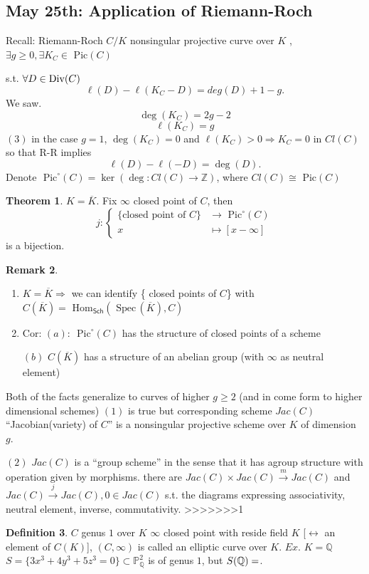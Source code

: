 \documentclass[11pt]{article}
\theoremstyle{definition}
\newtheorem{thm}{Theorem}[section]
\newtheorem{dfn}[thm]{Definition}
\newtheorem{rmk}[thm]{Remark}
\renewcommand{\hom}{\text{ Hom}}
\newcommand{\pic}{\text{ Pic}}
\newcommand{\spec}{\text{ Spec}\,}
\newcommand{\proj}{\mathbb P}
\newcommand{\intg}{\mathbb Z}
\newcommand{\ratl}{\mathbb Q}
\newcommand{\Div}{\textnormal{Div}}
\newcommand{\Lrta}{\Longrightarrow}
\newcommand{\lrta}{\longrightarrow}
\newcommand{\llrta}{\longleftrightarrow}
\begin{document}
\subsection{May 25th: Application of Riemann-Roch}

Recall:
Riemann-Roch $C/K$ nonsingular projective curve over $K$ , $\exists g\geq 0,\exists K_C\in  \pic(C)$

s.t. $\forall D\in \Div(C)$
$$
\ell(D)-\ell (K_C-D)=deg(D)+1-g.
$$
We saw. 
$$
\deg(K_C)=2g-2
$$
$$
\ell(K_C)=g
$$
$(3)$ in the case  $g=1$, $\deg(K_C)=0$ and $\ell(K_C)>0\Lrta K_C=0$ in $Cl(C)$ so that R-R
implies
$$
\ell(D)-\ell(-D)=\deg(D).
$$
Denote $\pic^\circ(C)=\ker(\deg:Cl(C)\lrta\intg)$, where $Cl(C)\cong \pic (C)$
\begin{thm}
$K=\overline{K}$. Fix $\infty$ closed point of $C$, then 
$$
j:\left\{\begin{aligned}
\{\text{closed point of $C$}\}&\lrta\pic^\circ(C)\\
x & \longmapsto [x-\infty]
\end{aligned}\right.
$$
is a bijection.

\end{thm}
\begin{rmk}
\begin{enumerate}[label=(\arabic*)]
\item $K=\overline{K}\Lrta $ we can identify \{ closed points of $C$\} with 
$C(\overline{K})=\hom_{\mathsf{Sch}}(\spec(\overline{K}),C)$
\item Cor: $(a)$: $\pic^\circ(C)$ has the structure of closed points of a scheme

$(b)$ $C(\overline{K})$ has  a structure of an abelian group (with $\infty$ as neutral element)
\end{enumerate}
\end{rmk}
Both of the facts generalize to curves of higher $g\geq 2$ (and in come form to higher dimensional schemes) $(1)$ is true but corresponding scheme $Jac(C)$ ``Jacobian(variety) of  $C$'' is a nonsingular projective scheme over $K$ of dimension $g$.

$(2)$ $Jac(C)$ is a ``group scheme'' in the sense that it has agroup structure with operation given by morphisms. there are $Jac(C)\times Jac(C)\overset{m}{\lrta} Jac(C)$ and $Jac(C)\overset{j}{\lrta}Jac(C), 0\in Jac(C)$ s.t. the diagrams expressing associativity, neutral element, inverse, commutativity.
>>>>>>>1

\begin{dfn}
 $C$ genus $1$ over $K$ $\infty$ closed point with reside field $K$ [$\llrta$ an  element of $C(K)$], $(C,\infty)$ is called an elliptic curve over $K$. $Ex$. $K=\ratl$ $S=\{3x^3+4y^3+5z^3=0\}\subset \proj^2_\ratl$  is of genus $1$, but $S(\ratl)=\empty$.
\end{dfn}
\end{document}
